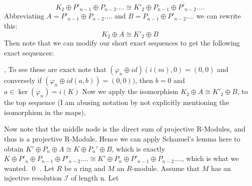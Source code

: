 \documentclass{article}
\begin{document}
$$K_2\oplus P'_{n-1} \oplus P_{n-2} .... \cong K'_2 \oplus P_{n-1} \oplus P'_{n-2} .... $$
\newline
Abbreviating $A= P'_{n-1} \oplus P_{n-2} ....$    and    $B= P_{n-1} \oplus P'_{n-2} ....$ we can rewrite this:
$$K_2\oplus A \cong K'_2 \oplus B $$
\newline
Then note that we can modify our short exact sequences to get the following exact sequences:
\newline
{}
\newline
{} ,
\newline
To see these are exact note that $(\varphi_n \oplus id) (i(m),0) = (0,0)$ and conversely if $(\varphi_n \oplus id(a,b)) = (0,0))$, then $b=0$ and $a \in \ker(\varphi_n) = i(K)$ 
\newline
\newline
Now we apply the isomorphism $K_2\oplus A \cong K'_2 \oplus B $, to the top sequence (I am abusing notation by not explicitly mentioning the isomorphism in the maps),
\newline
{}
\newline
{}
\newline
Now note that the middle node is the direct sum of projective R-Modules, and thus is a projective R-Module.  Hence we can apply Schanuel's lemma here to obtain
$K' \oplus P_n \oplus A \cong K \oplus P_n' \oplus B$, which is exactly 
$K\oplus P'_n \oplus P_{n-1} \oplus P'_{n-2} .... \cong K' \oplus P_n \oplus P'_{n-1} \oplus P_{n-2} .... $, which is what we wanted.
\qed
{}.
Let $R$ be a ring and $M$ an $R$-module.  Assume that $M$ has an injective resolution $\mathscr{I}$ of length n. Let
\begin{center}
\end{center}
\end{document}
